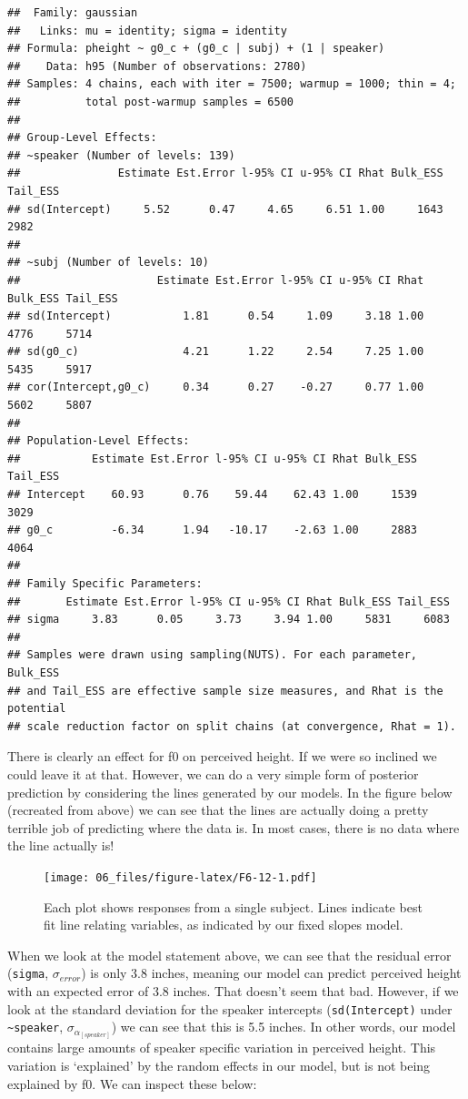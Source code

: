 \documentclass[
]{book}
\begin{document}
\begin{verbatim}
##  Family: gaussian 
##   Links: mu = identity; sigma = identity 
## Formula: pheight ~ g0_c + (g0_c | subj) + (1 | speaker) 
##    Data: h95 (Number of observations: 2780) 
## Samples: 4 chains, each with iter = 7500; warmup = 1000; thin = 4;
##          total post-warmup samples = 6500
## 
## Group-Level Effects: 
## ~speaker (Number of levels: 139) 
##               Estimate Est.Error l-95% CI u-95% CI Rhat Bulk_ESS Tail_ESS
## sd(Intercept)     5.52      0.47     4.65     6.51 1.00     1643     2982
## 
## ~subj (Number of levels: 10) 
##                     Estimate Est.Error l-95% CI u-95% CI Rhat Bulk_ESS Tail_ESS
## sd(Intercept)           1.81      0.54     1.09     3.18 1.00     4776     5714
## sd(g0_c)                4.21      1.22     2.54     7.25 1.00     5435     5917
## cor(Intercept,g0_c)     0.34      0.27    -0.27     0.77 1.00     5602     5807
## 
## Population-Level Effects: 
##           Estimate Est.Error l-95% CI u-95% CI Rhat Bulk_ESS Tail_ESS
## Intercept    60.93      0.76    59.44    62.43 1.00     1539     3029
## g0_c         -6.34      1.94   -10.17    -2.63 1.00     2883     4064
## 
## Family Specific Parameters: 
##       Estimate Est.Error l-95% CI u-95% CI Rhat Bulk_ESS Tail_ESS
## sigma     3.83      0.05     3.73     3.94 1.00     5831     6083
## 
## Samples were drawn using sampling(NUTS). For each parameter, Bulk_ESS
## and Tail_ESS are effective sample size measures, and Rhat is the potential
## scale reduction factor on split chains (at convergence, Rhat = 1).
\end{verbatim}

There is clearly an effect for f0 on perceived height. If we were so inclined we could leave it at that. However, we can do a very simple form of posterior prediction by considering the lines generated by our models. In the figure below (recreated from above) we can see that the lines are actually doing a pretty terrible job of predicting where the data is. In most cases, there is no data where the line actually is!

\begin{figure}
\centering
\texttt{[image: 06\_files/figure-latex/F6-12-1.pdf]}
\caption{\label{fig:F6-12}Each plot shows responses from a single subject. Lines indicate best fit line relating variables, as indicated by our fixed slopes model.}
\end{figure}

When we look at the model statement above, we can see that the residual error (\texttt{sigma}, \(\sigma_{error}\)) is only 3.8 inches, meaning our model can predict perceived height with an expected error of 3.8 inches. That doesn't seem that bad. However, if we look at the standard deviation for the speaker intercepts (\texttt{sd(Intercept)} under \texttt{\textasciitilde{}speaker}, \(\sigma_{\alpha_{[speaker]}}\)) we can see that this is 5.5 inches. In other words, our model contains large amounts of speaker specific variation in perceived height. This variation is `explained' by the random effects in our model, but is not being explained by f0. We can inspect these below:
\end{document}

